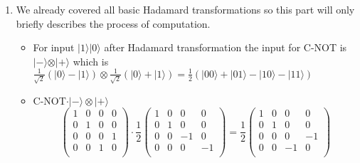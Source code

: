 \documentclass[a4paper,10pt]{article}
\newcommand{\qb}[1]{\ensuremath{\vert{#1}\rangle}}
\newcommand{\asp}{\ensuremath{\frac{1}{\sqrt{2}}}}
\newcommand{\ap}{\ensuremath{\frac{1}{2}}}
\begin{document}
\begin{enumerate}
\item We already covered all basic Hadamard transformations so this part will only briefly describes the process of computation. 
\begin{itemize}
\item For input \qb{1}\qb{0} after Hadamard transformation the input for C-NOT is \qb{-}$\otimes$\qb{+} which is $\asp (\qb{0}-\qb{1})\otimes \asp (\qb{0}+\qb{1})= \ap (\qb{00} + \qb{01} - \qb{10} - \qb{11})$
\item C-NOT$\cdot\qb{-}\otimes\qb{+}$ 
$$
\left( \begin{array}{cccc}
1 & 0 & 0 & 0 \\
0 & 1 & 0 & 0 \\
0 & 0 & 0 & 1 \\
0 & 0 & 1 & 0 \\
\end{array} \right)
\cdot \ap
\left( \begin{array}{cccc}
1 & 0 & 0 & 0 \\
0 & 1 & 0 & 0 \\
0 & 0 & -1 & 0 \\
0 & 0 & 0 & -1 \\
\end{array} \right)
=
\ap
\left( \begin{array}{cccc}
1 & 0 & 0 & 0 \\
0 & 1 & 0 & 0 \\
0 & 0 & 0 & -1 \\
0 & 0 & -1 & 0 \\
\end{array} \right)
$$


\end{itemize}
\end{enumerate}
\end{document}
